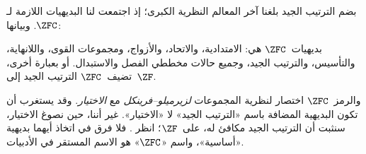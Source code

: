 \documentclass[../../../include/open-logic-section]{subfiles}
\begin{document}

بضم الترتيب الجيد بلغنا آخر المعالم النظرية الكبرى؛ إذ اجتمعت لنا
البديهيات اللازمة لـ$\ZFC$. وبيانها:

\begin{defn}
بديهيات~$\ZFC$ هي: الامتدادية، والاتحاد، والأزواج، ومجموعات القوى،
واللانهاية، والتأسيس، والترتيب الجيد، وجميع حالات مخططي الفصل
والاستبدال. أو بعبارة أخرى، تضيف~$\ZFC$ الترتيب الجيد إلى~$\ZF$.
\end{defn}

والرمز~$\ZFC$ اختصار لنظرية المجموعات \emph{لزيرميلو--فرينكل} مع
\emph{الاختيار}. وقد يستغرب أن تكون البديهية المضافة باسم «الترتيب
الجيد» لا «الاختيار». غير أننا، حين نصوغ {الاختيار}، سنثبت أن الترتيب
الجيد مكافئ له، على~$\ZF$؛ انظر
. فلا فرق في اتخاذ أيهما بديهية
«أساسية»، واسم «$\ZFC$» هو الاسم المستقر في الأدبيات.
\end{document}
